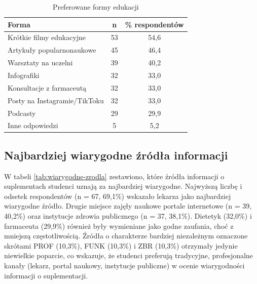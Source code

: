 \begin{table}[H]
    \centering
    \caption{Preferowane formy edukacji}
    \label{tab:formy}
    \begin{tabular}{|l|c|c|}
        \hline
        \textbf{Forma} & \textbf{n}  & \textbf{\% respondentów} \\
        \hline
        \hline
        Krótkie filmy edukacyjne & 53 & 54,6 \\
        \hline
        Artykuły popularnonaukowe & 45 & 46,4 \\
        \hline
        Warsztaty na uczelni & 39 & 40,2 \\
        \hline
        Infografiki & 32 & 33,0 \\
        \hline
        Konsultacje z farmaceutą & 32 & 33,0 \\
        \hline
        Posty na Instagramie/TikToku & 32 & 33,0 \\
        \hline
        Podcasty & 29 & 29,9 \\
        \hline
        Inne odpowiedzi & 5 & 5,2 \\
        \hline
    \end{tabular}
\end{table}



\subsection{Najbardziej wiarygodne źródła informacji}

% 

W tabeli \ref{tab:wiarygodne-zrodla} zestawiono, które źródła informacji o suplementach studenci uznają za najbardziej wiarygodne. Najwyższą liczbę i odsetek respondentów (n = 67, 69,1\%) wskazało lekarza jako najbardziej wiarygodne źródło. Drugie miejsce zajęły naukowe portale internetowe (n = 39, 40,2\%) oraz instytucje zdrowia publicznego (n = 37, 38,1\%). Dietetyk (32,0\%) i farmaceuta (29,9\%) również były wymieniane jako godne zaufania, choć z mniejszą częstotliwością. Źródła o charakterze bardziej niezależnym oznaczone skrótami PROF (10,3\%), FUNK (10,3\%) i ZBR (10,3\%) otrzymały jedynie niewielkie poparcie, co wskazuje, że studenci preferują tradycyjne, profesjonalne kanały (lekarz, portal naukowy, instytucje publiczne) w ocenie wiarygodności informacji o suplementacji.

